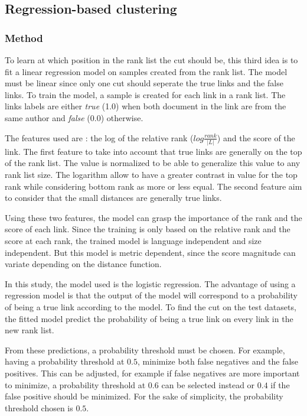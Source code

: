 \subsection{Regression-based clustering \label{sec:regression-based_clustering}}

\subsubsection{Method}

To learn at which position in the rank list the cut should be, this third idea is to fit a linear regression model on samples created from the rank list.
The model must be linear since only one cut should seperate the true links and the false links.
To train the model, a sample is created for each link in a rank list.
The links labels are either \textit{true} (1.0) when both document in the link are from the same author and \textit{false} (0.0) otherwise.

The features used are : the log of the relative rank ($log \frac{rank}{|L|}$) and the score of the link.
The first feature to take into account that true links are generally on the top of the rank list.
The value is normalized to be able to generalize this value to any rank list size.
The logarithm allow to have a greater contrast in value for the top rank while considering bottom rank as more or less equal.
The second feature aim to consider that the small distances are generally true links.

Using these two features, the model can grasp the importance of the rank and the score of each link.
Since the training is only based on the relative rank and the score at each rank, the trained model is language independent and size independent.
But this model is metric dependent, since the score magnitude can variate depending on the distance function.

In this study, the model used is the logistic regression.
The advantage of using a regression model is that the output of the model will correspond to a probability of being a true link according to the model.
To find the cut on the test datasets, the fitted model predict the probability of being a true link on every link in the new rank list.

From these predictions, a probability threshold must be chosen.
For example, having a probability threshold at $0.5$, minimize both false negatives and the false positives.
This can be adjusted, for example if false negatives are more important to minimize, a probability threshold at $0.6$ can be selected instead or $0.4$ if the false positive should be minimized.
For the sake of simplicity, the probability threshold chosen is $0.5$.

